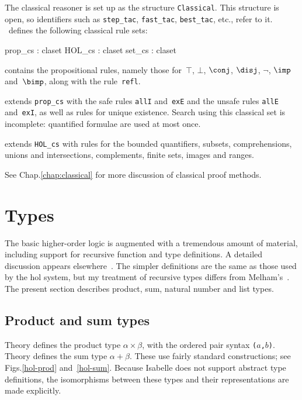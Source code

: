The classical reasoner is set up as the structure
{\tt Classical}.  This structure is open, so {\ML} identifiers such
as {\tt step_tac}, {\tt fast_tac}, {\tt best_tac}, etc., refer to it.
\HOL\ defines the following classical rule sets:
\begin{ttbox} 
prop_cs    : claset
HOL_cs     : claset
set_cs     : claset
\end{ttbox}
\begin{ttdescription}
\item[\ttindexbold{prop_cs}] contains the propositional rules, namely
those for~$\top$, $\bot$, $\conj$, $\disj$, $\neg$, $\imp$ and~$\bimp$,
along with the rule~{\tt refl}.

\item[\ttindexbold{HOL_cs}] extends {\tt prop_cs} with the safe rules
  {\tt allI} and~{\tt exE} and the unsafe rules {\tt allE}
  and~{\tt exI}, as well as rules for unique existence.  Search using
  this classical set is incomplete: quantified formulae are used at most
  once.

\item[\ttindexbold{set_cs}] extends {\tt HOL_cs} with rules for the bounded
  quantifiers, subsets, comprehensions, unions and intersections,
  complements, finite sets, images and ranges.
\end{ttdescription}
\noindent
See %
        {Chap.\ts\ref{chap:classical}} 
for more discussion of classical proof methods.


\section{Types}
The basic higher-order logic is augmented with a tremendous amount of
material, including support for recursive function and type definitions.  A
detailed discussion appears elsewhere~\cite{paulson-coind}.  The simpler
definitions are the same as those used by the {\sc hol} system, but my
treatment of recursive types differs from Melham's~\cite{melham89}.  The
present section describes product, sum, natural number and list types.

\subsection{Product and sum types}
Theory  defines the product type $\alpha\times\beta$, with
the ordered pair syntax {\tt($a$,$b$)}.  Theory  defines the
sum type $\alpha+\beta$.  These use fairly standard constructions; see
Figs.\ts\ref{hol-prod} and~\ref{hol-sum}.  Because Isabelle does not
support abstract type definitions, the isomorphisms between these types and
their representations are made explicitly.

